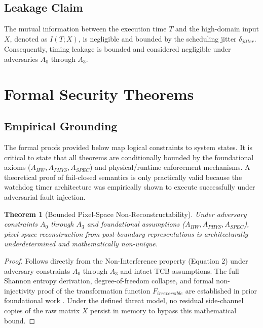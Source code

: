 \documentclass[conference]{IEEEtran}
\newtheorem{theorem}{Theorem}
\begin{document}
\subsection{Leakage Claim}
The mutual information between the execution time $T$ and the high-domain input $X$, denoted as $I(T; X)$, is negligible and bounded by the scheduling jitter $\delta_{jitter}$. Consequently, timing leakage is bounded and considered negligible under adversaries $A_0$ through $A_3$.




\section{Formal Security Theorems}

\subsection{Empirical Grounding}
The formal proofs provided below map logical constraints to system states. It is critical to state that all theorems are conditionally bounded by the foundational axioms ($A_{HW}, A_{PHYS}, A_{SPEC}$) and physical/runtime enforcement mechanisms. A theoretical proof of fail-closed semantics is only practically valid because the watchdog timer architecture was empirically shown to execute successfully under adversarial fault injection.

\begin{theorem}[Bounded Pixel-Space Non-Reconstructability]
Under adversary constraints $A_0$ through $A_3$ and foundational assumptions ($A_{HW}, A_{PHYS}, A_{SPEC}$), pixel-space reconstruction from post-boundary representations is architecturally underdetermined and mathematically non-unique.
\end{theorem}
\begin{proof}
Follows directly from the Non-Interference property (Equation 2) under adversary constraints $A_0$ through $A_3$ and intact TCB assumptions. The full Shannon entropy derivation, degree-of-freedom collapse, and formal non-injectivity proof of the transformation function $F_{irreversible}$ are established in prior foundational work \cite{b28_pose}. Under the defined threat model, no residual side-channel copies of the raw matrix $X$ persist in memory to bypass this mathematical bound.
\end{proof}
\end{document}

